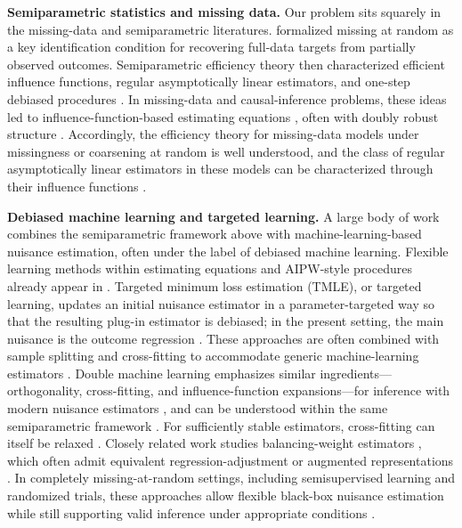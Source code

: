 \documentclass{article}
\theoremstyle{plain}
\theoremstyle{definition}
\newcommand{\1}{\mathbf{1}}
\begin{document}
\textbf{Semiparametric statistics and missing data.} Our problem sits squarely in the missing-data and semiparametric literatures. \citet{rubin1976} formalized missing at random as a key identification condition for recovering full-data targets from partially observed outcomes. Semiparametric efficiency theory then characterized efficient influence functions, regular asymptotically linear estimators, and one-step debiased procedures \citep{levit1975efficiency,pfanzagl1985contributions,hasminskii1979nonparametric,klaassen1987consistent,bickel1993efficient}. In missing-data and causal-inference problems, these ideas led to influence-function-based estimating equations \citep{robins1994estimation,robins1995analysis,robins1995semiparametric,vanderlaanunified,tsiatis2006semiparametric}, often with doubly robust structure \citep{bang2005doubly}. Accordingly, the efficiency theory for missing-data models under missingness or coarsening at random is well understood, and the class of regular asymptotically linear estimators in these models can be characterized through their influence functions \citep{robins1994estimation,robins1995analysis,robins1995semiparametric,vanderlaanunified,tsiatis2006semiparametric}.

\textbf{Debiased machine learning and targeted learning.} A large body of work combines the semiparametric framework above with machine-learning-based nuisance estimation, often under the label of debiased machine learning. Flexible learning methods within estimating equations and AIPW-style procedures already appear in \citet{vanderlaanunified}. Targeted minimum loss estimation (TMLE), or targeted learning, updates an initial nuisance estimator in a parameter-targeted way so that the resulting plug-in estimator is debiased; in the present setting, the main nuisance is the outcome regression \citep{van2006targeted,vanderLaanRose2011,gruber2009targeted,hoffman2020tmle,ross2025constructing}. These approaches are often combined with sample splitting and cross-fitting to accommodate generic machine-learning estimators \citep{schick1986asymptotically,klaassen1987consistent,zheng2010asymptotic,vanderLaanRose2011,DoubleML}. Double machine learning emphasizes similar ingredients---orthogonality, cross-fitting, and influence-function expansions---for inference with modern nuisance estimators \citep{DoubleML,chernozhukov2022automatic}, and can be understood within the same semiparametric framework \citep{vanderlaan2019cvtmle,diaz2020machine,chen2026equivalence}. For sufficiently stable estimators, cross-fitting can itself be relaxed \citep{chen2022stable}. Closely related work studies balancing-weight estimators \citep{hainmueller2012entropy,imai2014covariate,zubizarreta2015stable,lendle2015balancing,chattopadhyay2020balancing,hejazi2023revisiting}, which often admit equivalent regression-adjustment or augmented representations \citep{chattopadhyay2023implied,bruns2025augmented,rotnitzky2025note}. In completely missing-at-random settings, including semisupervised learning and randomized trials, these approaches allow flexible black-box nuisance estimation while still supporting valid inference under appropriate conditions \citep{moore2009covariate,moore2009increasing,rosenblum2009using,hojbjerre2025powering,hojbjerre2026within}.
\end{document}
